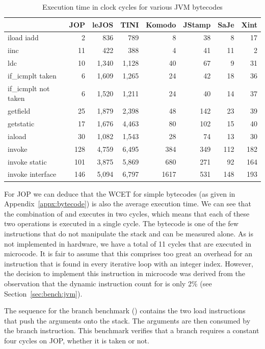 \begin{table}
    \centering
    \begin{tabular}{lrrrrrrr}
        \toprule

 & JOP & leJOS & TINI & Komodo & JStamp & SaJe & Xint\\
        \midrule
iload iadd  & 2 & 836 & 789 & 8 & 38 & 8 & 17\\
iinc          & 11 & 422 & 388 & 4 & 41 & 11 & 2\\
ldc           & 10 & 1,340 & 1,128 & 40 & 67 & 9 & 31\\
if\_icmplt taken & 6 & 1,609 & 1,265 & 24 & 42 & 18 & 36\\
if\_icmplt not taken & 6 & 1,520 & 1,211 & 24 & 40 & 14 & 37\\
getfield & 25 & 1,879 & 2,398 & 48 & 142 & 23 & 39\\
getstatic & 17 & 1,676 & 4,463 & 80 & 102 & 15 & 40\\
iaload & 30 & 1,082 & 1,543 & 28 & 74 & 13 & 30\\
invoke        & 128 & 4,759 & 6,495 & 384 & 349 & 112 & 182\\
invoke static & 101 & 3,875 & 5,869 & 680 & 271 & 92 & 164\\
invoke interface & 146 & 5,094 & 6,797 & 1617 & 531 & 148 & 193\\

        \bottomrule
    \end{tabular}
    \caption{Execution time in clock cycles for various JVM bytecodes}
    \label{tab:results:bench:clock}
\end{table}

For JOP we can deduce that the WCET for simple bytecodes (as given
in Appendix~\ref{appx:bytecode}) is also the average execution time.
We can see that the combination of  and 
executes in two cycles, which means that each of these two
operations is executed in a single cycle. The  bytecode
is one of the few instructions that do not manipulate the stack and
can be measured alone. As  is not implemented in
hardware, we have a total of 11 cycles that are executed in
microcode. It is fair to assume that this comprises too great an
overhead for an instruction that is found in every iterative loop
with an integer index. However, the decision to implement this
instruction in microcode was derived from the observation that the
dynamic instruction count for  is only 2\% (see
Section~\ref{sec:bench:jvm}).

The sequence for the branch benchmark () contains
the two load instructions that push the arguments onto the stack.
The arguments are then consumed by the branch instruction. This
benchmark verifies that a branch requires a constant four cycles on
JOP, whether it is taken or not.


